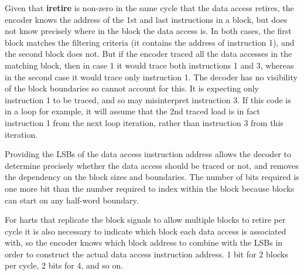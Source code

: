 Given that \textbf{iretire} is non-zero in the same cycle that the data access retires, the encoder knows the address of 
the 1st and last instructions in a block, but does not know precisely where in the block the data access is.  
In both cases, the first block matches the filtering criteria (it contains the address of instruction 1), and the second block does not.  
But if the encoder traced all the data accesses in the matching block, then in case 1 it would trace both instructions 1 and 3, whereas 
in the second case it would trace only instruction 1.  The decoder has no visibility of the block boundaries so cannot account for this.
It is expecting only instruction 1 to be traced, and so may misinterpret instruction 3.  If this code is in a loop for example, it will 
assume that the 2nd traced load is in fact instruction 1 from the next loop iteration, rather than instruction 3 from this iteration.
 
Providing the LSBs of the data access instruction address allows the decoder to determine precisely whether the data access should be 
traced or not, and removes the dependency on the block sizes and boundaries.  The number of bits required is one more bit than the 
number required to index within the block because blocks can start on any half-word boundary.
 
For harts that replicate the block signals to allow multiple blocks to retire per cycle it is also necessary to indicate which block 
each data access is associated with, so the encoder knows which block address to combine with the LSBs in order to construct the 
actual data access instruction address.  1 bit for 2 blocks per cycle, 2 bits for 4, and so on.

